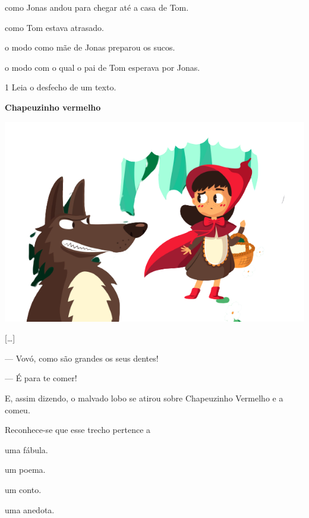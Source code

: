 \begin{escolha}
\item como Jonas andou para chegar até a casa de Tom.

\item como Tom estava atrasado.

\item o modo como mãe de Jonas preparou os sucos.

\item o modo com o qual o pai de Tom esperava por Jonas.
\end{escolha}


\pagebreak
\vspace*{-3.4cm}

\num{1} Leia o desfecho de um texto.

\begin{myquote}
\textbf{Chapeuzinho vermelho}

\begin{center}
\includegraphics[width=.7\textwidth]{./media/image23j.png}
\end{center}

{[}\ldots{}{]}

--- Vovó, como são grandes os seus dentes!

--- É para te comer!

E, assim dizendo, o malvado lobo se atirou sobre Chapeuzinho Vermelho e a
comeu.

\end{myquote}

Reconhece-se que esse trecho pertence a

\begin{escolha}
\begin{multicols}
\item uma fábula.

\item um poema.

\item um conto.

\item uma anedota.
\end{multicols}
\end{escolha}

